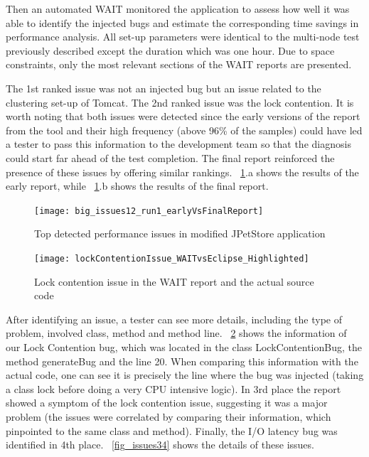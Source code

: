 \documentclass[runningheads,a4paper]{llncs}
\begin{document}
Then an automated WAIT monitored the application to assess how well
it was able to identify the injected bugs and estimate the corresponding time
savings in performance analysis. All set-up parameters were identical to
the multi-node test previously described except the duration which
was one hour. Due to space constraints, only the most relevant sections
of the WAIT reports are presented.

The 1st ranked issue was not an injected bug but an issue related to the
clustering set-up of Tomcat.
The 2nd ranked issue was the lock
contention. It is worth noting that both issues were
detected since the early versions of the report from the tool and their
high frequency (above 96\% of the samples) could have led a tester to pass this
information to the development team so that the diagnosis could start far ahead
of the test completion. The final report reinforced the presence of these issues 
by offering similar rankings. \figurename ~\ref{fig_run1_bugs12}.a shows the
results of the early report, while ~\ref{fig_run1_bugs12}.b shows the results of 
the final report.

\begin{figure}[!h]
\centering
\texttt{[image: big\_issues12\_run1\_earlyVsFinalReport]}
\caption{Top detected performance issues in modified JPetStore application}
\label{fig_run1_bugs12}
\end{figure}

\begin{figure}[!h]
\centering
\texttt{[image: lockContentionIssue\_WAITvsEclipse\_Highlighted]}
\caption{Lock contention issue in the WAIT report and the actual source code}
\label{fig_issue2_vs_code}
\end{figure}

After identifying an issue, a tester can see more details, including the type of
problem, involved class, method and method line. \figurename
~\ref{fig_issue2_vs_code} shows the information of our Lock Contention bug,
which was located in the class LockContentionBug, the method generateBug and the
line 20. When comparing this information with the actual code, one can see it
is precisely the line where the bug was injected (taking a class lock before
doing a very CPU intensive logic). In 3rd place the report showed a symptom of
the lock contention issue, suggesting it was a major problem (the issues were
correlated by comparing their information, which pinpointed to the same class and
method). Finally, the I/O latency bug was identified in 4th place. \figurename
~\ref{fig_issues34} shows the details of these issues.
\end{document}
